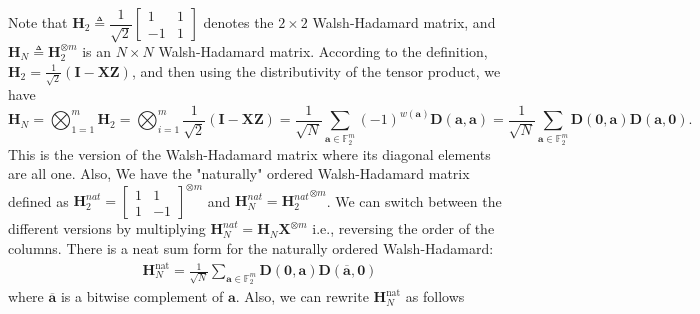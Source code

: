 \documentclass[lettersize,journal,onecolumn]{IEEEtran}
\begin{document}
  \noindent Note that $\mathbf{H}_2 \triangleq \dfrac{1}{\sqrt{2}}\begin{bmatrix} 1 & 1 \\ -1 & 1 \end{bmatrix}$ denotes the $2 \times 2$ Walsh-Hadamard matrix, and $\mathbf{H}_N \triangleq \mathbf{H}^{\otimes m}_2$ is an $N\times N$ Walsh-Hadamard matrix. According to the definition, $\mathbf{H}_2 = \frac{1}{\sqrt{2}}(\mathbf{I} - \mathbf{XZ})$, and then using the distributivity of the tensor product, we have
\begin{equation}\label{HadamardNonNat}
	\mathbf{H}_N = \bigotimes_{1=1}^m \mathbf{H}_2 =	\bigotimes_{i = 1}^m \frac{1}{\sqrt{2}} (\mathbf{I} - \mathbf{XZ}) = \frac{1}{\sqrt{N}}\sum_{\mathbf{a} \in \mathbb{F}_2^m} (-1)^{w(\mathbf{a})}\mathbf{D}(\mathbf{a},\mathbf{a}) = \frac{1}{\sqrt{N}} \sum_{\mathbf{a} \in \mathbb{F}_2^m} \mathbf{D}(\mathbf{0},\mathbf{a})\mathbf{D}(\mathbf{a},\mathbf{0}).
\end{equation}
This is the version of the Walsh-Hadamard matrix where its diagonal elements are all one. Also, We have the "naturally" ordered Walsh-Hadamard matrix defined as $\mathbf{H}_2^{nat} = \begin{bmatrix} 1 & 1 \\ 1 & -1 \end{bmatrix}^{\otimes m}$ and $\mathbf{H}_N^{nat} = {\mathbf{H}_2^{nat}}^{\otimes m}$. We can switch between the different versions by multiplying $\mathbf{H}_N^{nat} = \mathbf{H}_N\mathbf{X}^{\otimes m}$ i.e., reversing the order of the columns.
There is a neat sum form for the naturally ordered Walsh-Hadamard:
\begin{align*}
	\mathbf{H}^{\text{nat}}_N = \frac{1}{\sqrt{N}} \sum_{\mathbf{a} \in \mathbb{F}_2^m} \mathbf{D}(\mathbf{0}, \mathbf{a}) \mathbf{D}(\overline{\mathbf{a}}, \mathbf{0})
\end{align*}
where $\overline{\mathbf{a}}$ is a bitwise complement of $\mathbf{a}$. Also, we can rewrite $\mathbf{H}_N^{\text{nat}}$ as follows
\end{document}
